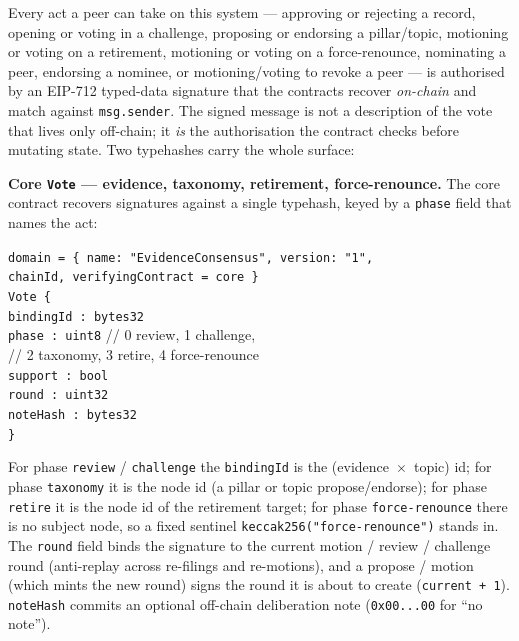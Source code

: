 \documentclass[11pt,a4paper]{article}
\begin{document}
Every act a peer can take on this system --- approving or rejecting a
record, opening or voting in a challenge, proposing or endorsing a
pillar/topic, motioning or voting on a retirement, motioning or voting
on a force-renounce, nominating a peer, endorsing a nominee, or
motioning/voting to revoke a peer --- is authorised by an EIP-712
typed-data signature that the contracts recover \emph{on-chain} and
match against \texttt{msg.sender}. The signed message is not a
description of the vote that lives only off-chain; it \emph{is} the
authorisation the contract checks before mutating state. Two typehashes
carry the whole surface:

\textbf{Core \texttt{Vote} --- evidence, taxonomy, retirement,
force-renounce.} The core contract recovers signatures against a single
typehash, keyed by a \texttt{phase} field that names the act:

\begin{plainbox}
\small
\texttt{domain = \{ name: "EvidenceConsensus", version: "1",}\\
\hspace*{2em}\texttt{chainId, verifyingContract = core \}}\\[0.5em]
\texttt{Vote \{}\\
\hspace*{1.5em}\texttt{bindingId : bytes32}\\
\hspace*{1.5em}\texttt{phase     : uint8}\;\; // 0 review, 1 challenge,\\
\hspace*{1.5em}\hspace*{8.5em}    // 2 taxonomy, 3 retire, 4 force-renounce\\
\hspace*{1.5em}\texttt{support   : bool}\\
\hspace*{1.5em}\texttt{round     : uint32}\\
\hspace*{1.5em}\texttt{noteHash  : bytes32}\\
\texttt{\}}
\end{plainbox}

For phase \texttt{review} / \texttt{challenge} the \texttt{bindingId} is
the (evidence~$\times$~topic) id; for phase \texttt{taxonomy} it is the
node id (a pillar or topic propose/endorse); for phase \texttt{retire}
it is the node id of the retirement target; for phase
\texttt{force-renounce} there is no subject node, so a fixed sentinel
\texttt{keccak256("force-renounce")} stands in. The \texttt{round}
field binds the signature to the current motion / review / challenge
round (anti-replay across re-filings and re-motions), and a propose /
motion (which mints the new round) signs the round it is about to
create (\texttt{current + 1}). \texttt{noteHash} commits an optional
off-chain deliberation note (\texttt{0x00...00} for ``no note'').
\end{document}
